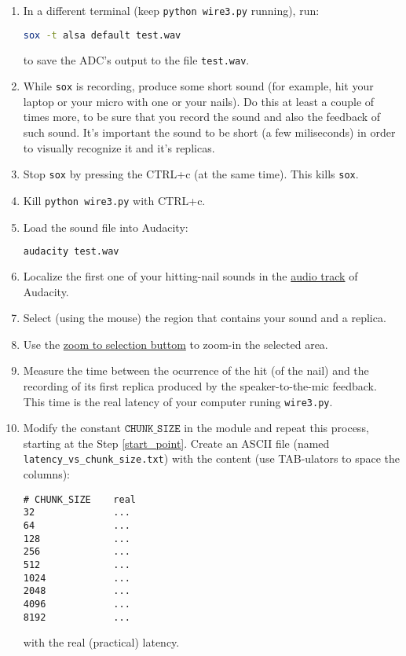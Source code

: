 \begin{enumerate}
\item In a different terminal (keep \texttt{python wire3.py} running),
  run:

  \begin{lstlisting}[language=Bash]
sox -t alsa default test.wav
  \end{lstlisting}

  to save the ADC's output to the file \texttt{test.wav}.

\item While \texttt{sox} is recording, produce some short sound (for
  example, hit your laptop or your micro with one or your nails). Do
  this at least a couple of times more, to be sure that you record the
  sound and also the feedback of such sound. It's important the sound
  to be short (a few miliseconds) in order to visually recognize it
  and it's replicas.

\item Stop \texttt{sox} by pressing the CTRL+c (at the same
  time). This kills \texttt{sox}.

\item Kill \texttt{python wire3.py} with CTRL+c.

\item Load the sound file into Audacity:
    
  \begin{lstlisting}[language=Bash]
audacity test.wav
  \end{lstlisting}

\item Localize the first one of your hitting-nail sounds in the
  \href{https://manual.audacityteam.org/man/audio_tracks.html}{audio
    track} of Audacity.

\item Select (using the mouse) the region that contains your sound and
  a replica.

\item Use the
  \href{https://manual.audacityteam.org/man/edit_toolbar.html#zoom_to_selection}{zoom
    to selection buttom} to zoom-in the selected area.

\item Measure the time between the ocurrence of the hit (of the nail)
  and the recording of its first replica produced by the
  speaker-to-the-mic feedback. This time is the real latency of your
  computer runing \texttt{wire3.py}.

\item Modify the constant $\mathtt{CHUNK\_SIZE}$ in the module and
  repeat this process, starting at the Step \ref{start_point}. Create
  an ASCII file (named \texttt{latency\_vs\_chunk\_size.txt}) with the
  content (use TAB-ulators to space the columns):
\begin{verbatim}
# CHUNK_SIZE    real
32              ...
64              ...
128             ...
256             ...
512             ...
1024            ...
2048            ...
4096            ...
8192            ...
\end{verbatim}
with the real (practical) latency.
\end{enumerate}

